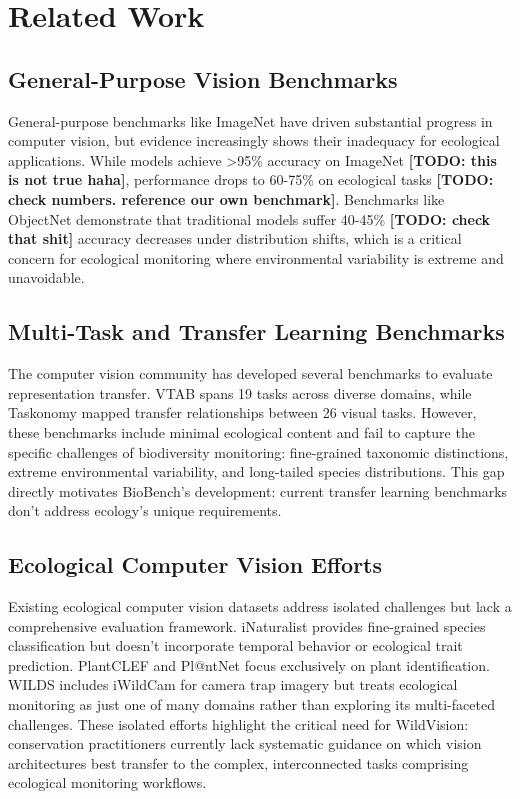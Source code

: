 \documentclass{article}
\newcommand{\todo}[1]{\textbf{\color{red}[TODO: #1]}}
\newcommand{\benchmarkname}{WildVision}
\begin{document}
\section{Related Work}

\subsection{General-Purpose Vision Benchmarks}

General-purpose benchmarks like ImageNet \cite{deng2009imagenet} have driven substantial progress in computer vision, but evidence increasingly shows their inadequacy for ecological applications. While models achieve >95\% accuracy on ImageNet \todo{this is not true haha}, performance drops to 60-75\% on ecological tasks \cite{beery2018recognition, van2018inaturalist} \todo{check numbers. reference our own benchmark}. 
Benchmarks like ObjectNet \cite{barbu2019objectnet} demonstrate that traditional models suffer 40-45\% \todo{check that shit} accuracy decreases under  distribution shifts, which is a critical concern for ecological monitoring where environmental variability is extreme and unavoidable.

\subsection{Multi-Task and Transfer Learning Benchmarks}

The computer vision community has developed several benchmarks to evaluate representation transfer. 
VTAB \cite{zhai2019large} spans 19 tasks across diverse domains, while Taskonomy \cite{zamir2018taskonomy} mapped transfer relationships between 26 visual tasks. 
However, these benchmarks include minimal ecological content and fail to capture the specific challenges of biodiversity monitoring: fine-grained taxonomic distinctions, extreme environmental variability, and long-tailed species distributions. 
This gap directly motivates BioBench's development: current transfer learning benchmarks don't address ecology's unique requirements.

\subsection{Ecological Computer Vision Efforts}

Existing ecological computer vision datasets address isolated challenges but lack a comprehensive evaluation framework. 
iNaturalist \cite{van2018inaturalist} provides fine-grained species classification but doesn't incorporate temporal behavior or ecological trait prediction. PlantCLEF \cite{plantclef} and Pl@ntNet \cite{plantnet} focus exclusively on plant identification. 
WILDS \cite{koh2021wilds} includes iWildCam for camera trap imagery but treats ecological monitoring as just one of many domains rather than exploring its multi-faceted challenges. 
These isolated efforts highlight the critical need for \benchmarkname{}: conservation practitioners currently lack systematic guidance on which vision architectures best transfer to the complex, interconnected tasks comprising ecological monitoring workflows.
\end{document}
